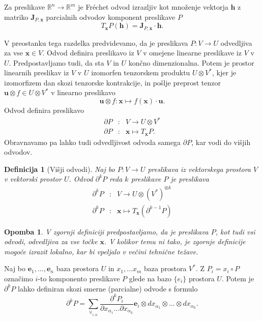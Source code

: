 \documentclass[a4paper, 12pt]{book}
\newcommand{\RR}{\mathbb{R}}
\newcommand{\e}{\mathbf{e}}
\newcommand{\x}{\mathbf{x}}
\newcommand{\h}{\mathbf{h}}
\newcommand{\uu}{\mathbf{u}}
\newcommand{\D}{\partial}
\newtheorem{opomba}{Opomba}[chapter]
\newtheorem{definicija}{Definicija}[chapter]
\begin{document}
Za preslikave $\RR^n\to\RR^m$ je Fréchet odvod izrazljiv kot množenje vektorja $\h$ z matriko $\mathbf{J}_{P,\x}$ parcialnih odvodov komponent preslikave $P$
\begin{equation*}
  T_\x P(\h) = \mathbf{J}_{P,\x}\cdot \h.
\end{equation*}

V preostanku tega razdelka predvidevamo, da je preslikava $P:V\to U$ odvedljiva za vse $\x\in V$. Odvod definira preslikavo iz $V$ v omejene linearne preslikave iz $V$ v $U$. Predpostavljamo tudi, da sta $V$ in $U$ končno dimenzionalna. Potem je prostor linearnih preslikav iz $V$ v $U$ izomorfen tenzorskem produktu $U\otimes V^*$, kjer je izomorfizem dan skozi tenzorske kontrakcije, in pošlje preprost tenzor $\uu\otimes f\in U\otimes V^*$ v linearno preslikavo
\begin{equation}
   \label{eq:lin_tenzor}
   \uu\otimes f:\x \mapsto f(\x)\cdot \uu.
 \end{equation}
Odvod definira preslikavo
\begin{eqnarray}
  \label{eq:odvod_preslikava}
  \D P&:& V\to U\otimes V^*\\
  \D P&:& \x \mapsto T_\x P.
\end{eqnarray}
Obravnavamo pa lahko tudi odvedljivost odvoda samega $\D P$, kar vodi do višjih odvodov.
\begin{definicija}[Višji odvodi]
Naj bo $P:V\to U$ preslikava iz vektorskega prostora $V$ v vektorski prostor $U$. Odvod $\D^k P$ reda $k$ preslikave $P$ je preslikava
\begin{eqnarray}\label{eq:partial}
    \label{eq:visji_odvod}
    \D^kP&:&V\to U\otimes (V^*)^{\otimes k}\\
    \D^kP&:&\x\mapsto T_\x\left( \D^{k-1}P \right)
  \end{eqnarray}
\end{definicija}
\begin{opomba}
V zgornji definiciji predpostavljamo, da je preslikava $P$, kot tudi vsi odvodi, odvedljiva za vse točke $\x$. V kolikor temu ni tako, je zgornje definicije mogoče izrazit lokalno, kar bi vpeljalo v večini tehnične težave.
\end{opomba}
Naj bo  $\e_1,\ldots,\e_n$ baza prostora $U$ in $x_1,\ldots x_m$ baza prostora $V^*$. Z $P_i=x_i\circ P$ označimo $i$-to komponento preslikave $P$ glede na bazo $\{e_i\}$ prostora $U$. Potem je $\D^k P$ lahko definiran skozi smerne (parcialne) odvode s formulo
\begin{equation}\label{eq:d}
	\partial^kP=\sum_{\forall_{i,\alpha}}\frac{\partial^k P_i}{\partial
	    x_{\alpha_1}\ldots \partial x_{\alpha_k}}\e_i\otimes
	  dx_{\alpha_1}\otimes\ldots \otimes dx_{\alpha_k}.
\end{equation}
\end{document}
